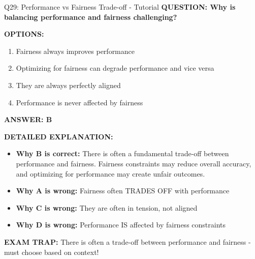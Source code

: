 \documentclass[8pt]{beamer}
\begin{document}
	\begin{frame}{Q29: Performance vs Fairness Trade-off - Tutorial}
		\fontsize{6.5}{7.5}\selectfont
		\textbf{QUESTION: Why is balancing performance and fairness challenging?}
		
		\vspace{0.1cm}
		\textbf{OPTIONS:}
		\begin{enumerate}
			\item Fairness always improves performance
			\item Optimizing for fairness can degrade performance and vice versa
			\item They are always perfectly aligned
			\item Performance is never affected by fairness
		\end{enumerate}
		
		\vspace{0.1cm}
		\textcolor{myblue}{\textbf{ANSWER: B}}
		
		\vspace{0.1cm}
		\textbf{DETAILED EXPLANATION:}
		\begin{itemize}
			\item \textbf{Why B is correct:} There is often a fundamental trade-off between performance and fairness. Fairness constraints may reduce overall accuracy, and optimizing for performance may create unfair outcomes.
			\item \textbf{Why A is wrong:} Fairness often TRADES OFF with performance
			\item \textbf{Why C is wrong:} They are often in tension, not aligned
			\item \textbf{Why D is wrong:} Performance IS affected by fairness constraints
		\end{itemize}
		
		\textcolor{myred}{\textbf{EXAM TRAP:}} There is often a \textcolor{myblue}{trade-off between performance and fairness} - must choose based on context!
	\end{frame}
	
\end{document}
